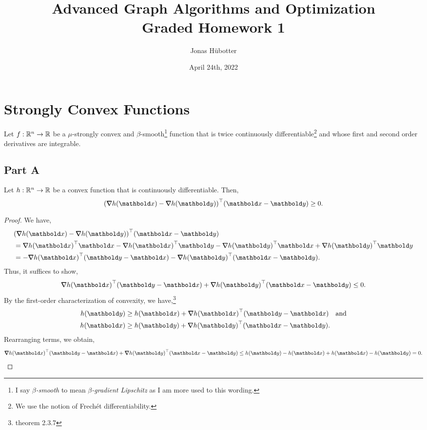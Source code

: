 \documentclass{tufte-handout}
\title[Graded Homework 1]{Advanced Graph Algorithms and Optimization \\ Graded Homework 1}
\author{Jonas Hübotter}
\date{April 24th, 2022}
\begin{document}
\maketitle

\section{Strongly Convex Functions}
Let $f : \mathbb{R}^n \to \mathbb{R}$ be a $\mu$-strongly convex and $\beta$-smooth\footnote{I say \emph{$\beta$-smooth} to mean \emph{$\beta$-gradient Lipschitz} as I am more used to this wording.} function that is twice continuously differentiable\footnote{We use the notion of Frechét differentiability.} and whose first and second order derivatives are integrable.

\subsection{Part A}\label{part:1A}
\begin{lem}
Let $h : \mathbb{R}^n \to \mathbb{R}$ be a convex function that is continuously differentiable. Then, \begin{align}
    \trans{(\grad h(\vx) - \grad h(\vy))}(\vx - \vy) \geq 0.
\end{align}
\end{lem}
\begin{proof}
We have, \begin{align*}
    &\trans{(\grad h(\vx) - \grad h(\vy))}(\vx - \vy) \\
    &= \trans{\grad h(\vx)}\vx - \trans{\grad h(\vx)}\vy - \trans{\grad h(\vy)}\vx + \trans{\grad h(\vy)}\vy \\
    &= - \trans{\grad h(\vx)}(\vy - \vx) - \trans{\grad h(\vy)}(\vx - \vy).
\end{align*} Thus, it suffices to show, \begin{align*}
    \trans{\grad h(\vx)}(\vy - \vx) + \trans{\grad h(\vy)}(\vx - \vy) \leq 0.
\end{align*} By the first-order characterization of convexity, we have,\footnote{theorem 2.3.7} \begin{align*}
    h(\vy) &\geq h(\vx) + \trans{\grad h(\vx)}(\vy - \vx) \quad \text{and} \\
    h(\vx) &\geq h(\vy) + \trans{\grad h(\vy)}(\vx - \vy).
\end{align*} Rearranging terms, we obtain, \begin{align*}
    \trans{\grad h(\vx)}(\vy - \vx) + \trans{\grad h(\vy)}(\vx - \vy) \leq h(\vy) - h(\vx) + h(\vx) - h(\vy) = 0.
\end{align*}
\end{proof}
\end{document}

